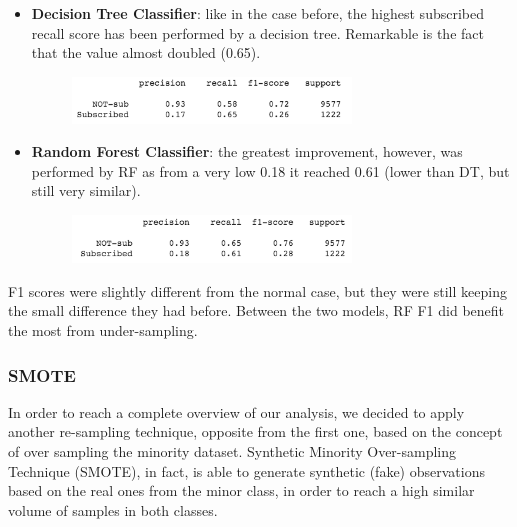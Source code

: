 \begin{itemize}
\item \textbf{Decision Tree Classifier}: like in the case before, the highest subscribed recall score has been performed by a decision tree. Remarkable is the fact that the value almost doubled (0.65). 

\begin{figure}[H]
\centering
\includegraphics[width=0.7\textwidth]{Img/under_tree.png}
\end{figure}
\item \textbf{Random Forest Classifier}: the greatest improvement, however, was performed by RF as from a very low 0.18 it reached 0.61 (lower than DT, but still very similar).

\begin{figure}[H]
\centering
\includegraphics[width=0.7\textwidth]{Img/under_forest.png}
\end{figure}
\end{itemize}

F1 scores were slightly different from the normal case, but they were still keeping the small difference they had before. Between the two models, RF F1 did benefit the most from under-sampling.


\subsubsection{SMOTE}
In order to reach a complete overview of our analysis, we decided to apply another re-sampling technique, opposite from the first one, based on the concept of over sampling the minority dataset. Synthetic Minority Over-sampling Technique (SMOTE), in fact, is able to generate synthetic (fake) observations based on the real ones from the minor class, in order to reach a high similar volume of samples in both classes.


